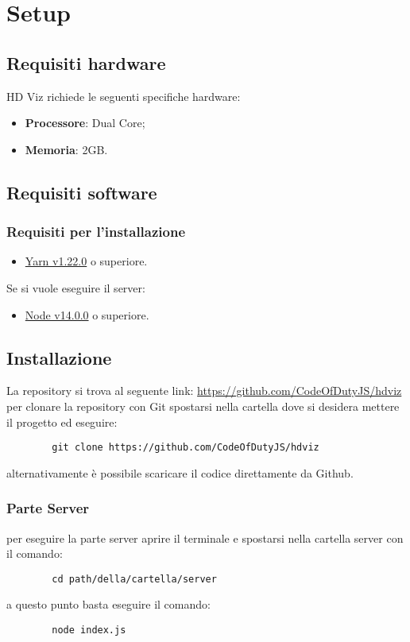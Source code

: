 \section{Setup}
    \subsection{Requisiti hardware}
    HD Viz richiede le seguenti specifiche hardware:
    \begin{itemize}
        \item \textbf{Processore}: Dual Core;
        \item \textbf{Memoria}: 2GB.
    \end{itemize}
    \subsection{Requisiti software}
        \subsubsection{Requisiti per l'installazione}
        \begin{itemize}
            \item \href{https://yarnpkg.com/}{Yarn v1.22.0} o superiore.
        \end{itemize}
        Se si vuole eseguire il server:
        \begin{itemize}
            \item \href{https://nodejs.org/en/}{Node v14.0.0} o superiore.
        \end{itemize}
    \subsection{Installazione}
    La repository si trova al seguente link:
    \url{https://github.com/CodeOfDutyJS/hdviz}
    \\
    per clonare la repository con Git spostarsi nella cartella dove si desidera mettere il progetto ed eseguire:
    \begin{verbatim}
        git clone https://github.com/CodeOfDutyJS/hdviz
    \end{verbatim}
    alternativamente è possibile scaricare il codice direttamente da Github.
        \subsubsection{Parte Server}
        per eseguire la parte server aprire il terminale e spostarsi nella cartella server con il comando:
        \begin{verbatim}
        cd path/della/cartella/server
        \end{verbatim}
        a questo punto basta eseguire il comando:
        \begin{verbatim}
        node index.js
        \end{verbatim}
